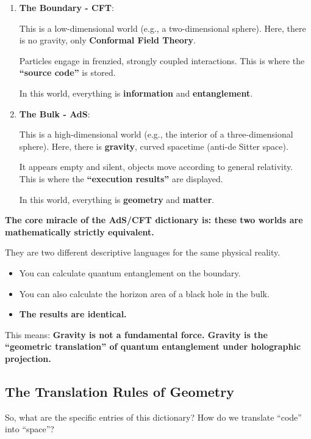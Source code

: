 \begin{enumerate}
\item \textbf{The Boundary - CFT}:

   This is a low-dimensional world (e.g., a two-dimensional sphere). Here, there is no gravity, only \textbf{Conformal Field Theory}.

   Particles engage in frenzied, strongly coupled interactions. This is where the \textbf{``source code''} is stored.

   In this world, everything is \textbf{information} and \textbf{entanglement}.

\item \textbf{The Bulk - AdS}:

   This is a high-dimensional world (e.g., the interior of a three-dimensional sphere). Here, there is \textbf{gravity}, curved spacetime (anti-de Sitter space).

   It appears empty and silent, objects move according to general relativity. This is where the \textbf{``execution results''} are displayed.

   In this world, everything is \textbf{geometry} and \textbf{matter}.
\end{enumerate}

\textbf{The core miracle of the AdS/CFT dictionary is: these two worlds are mathematically strictly equivalent.}

They are two different descriptive languages for the same physical reality.

\begin{itemize}
\item You can calculate quantum entanglement on the boundary.

\item You can also calculate the horizon area of a black hole in the bulk.

\item \textbf{The results are identical.}
\end{itemize}

This means: \textbf{Gravity is not a fundamental force. Gravity is the ``geometric translation'' of quantum entanglement under holographic projection.}

\subsection{The Translation Rules of Geometry}

So, what are the specific entries of this dictionary? How do we translate ``code'' into ``space''?

